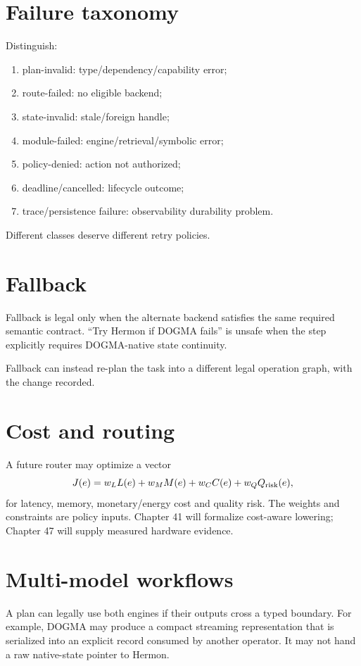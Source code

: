 \section{Failure taxonomy}
Distinguish:
\begin{enumerate}
\item plan-invalid: type/dependency/capability error;
\item route-failed: no eligible backend;
\item state-invalid: stale/foreign handle;
\item module-failed: engine/retrieval/symbolic error;
\item policy-denied: action not authorized;
\item deadline/cancelled: lifecycle outcome;
\item trace/persistence failure: observability durability problem.
\end{enumerate}
Different classes deserve different retry policies.

\section{Fallback}
Fallback is legal only when the alternate backend satisfies the same required semantic contract. ``Try Hermon if DOGMA fails'' is unsafe when the step explicitly requires DOGMA-native state continuity.

Fallback can instead re-plan the task into a different legal operation graph, with the change recorded.

\section{Cost and routing}
A future router may optimize a vector
\[
J(e)=w_L L(e)+w_M M(e)+w_C C(e)+w_Q Q_{\rm risk}(e),
\]
for latency, memory, monetary/energy cost and quality risk. The weights and constraints are policy inputs. Chapter 41 will formalize cost-aware lowering; Chapter 47 will supply measured hardware evidence.

\section{Multi-model workflows}
A plan can legally use both engines if their outputs cross a typed boundary. For example, DOGMA may produce a compact streaming representation that is serialized into an explicit record consumed by another operator. It may not hand a raw native-state pointer to Hermon.

